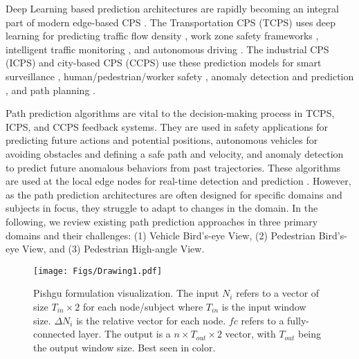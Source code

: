 \documentclass[sigconf]{acmart}
\begin{document}
Deep Learning based prediction architectures are rapidly becoming an integral part of modern edge-based CPS \cite{Zhou2021wide_atten, Isern2020Reconfig, deniz2022efficient}. The Transportation CPS (TCPS) uses deep learning for predicting traffic flow density \cite{Jeong2013traffFlow, chen2017research}, work zone safety frameworks \cite{sabeti2021toward, fang2018detecting, cai2020context}, intelligent traffic monitoring \cite{Chen2020WITM}, and autonomous driving \cite{cui2019multimodal, hussain2022vision}. The industrial CPS (ICPS) and city-based CPS (CCPS)  use these prediction models for smart surveillance \cite{Isern2020Reconfig, wu2019deep, pazho2023ancilia}, human/pedestrian/worker safety \cite{deniz2022efficient, wang2022intelligent}, anomaly detection and prediction \cite{jones2014anomaly, pustokhina2021automated}, and path planning \cite{farooq2021flow}. 

Path prediction algorithms are vital to the decision-making process in TCPS, ICPS, and CCPS feedback systems. They are used in safety applications for predicting future actions and potential positions, autonomous vehicles for avoiding obstacles and defining a safe path and velocity, and anomaly detection to predict future anomalous behaviors from past trajectories. These algorithms are used at the local edge nodes for real-time detection and prediction \cite{Isern2020Reconfig, sanchez2021real, jeon2020scale}. However, as the path prediction architectures are often designed for specific domains and subjects in focus, they struggle to adapt to changes in the domain. In the following, we review existing path prediction approaches in three primary domains and their {challenges}: (1) Vehicle Bird's-eye View, (2) Pedestrian Bird's-eye View, and (3) Pedestrian High-angle View.

\begin{figure*}[!b]
        \centering
               \texttt{[image: Figs/Drawing1.pdf]}
                
                \caption{Pishgu formulation visualization. The input $N_i$ refers to a vector of size $T_{in}\times2$ for each node/subject where $T_{in}$ is the input window size. $\Delta N_i$ is the relative vector for each node. $fc$ refers to a fully-connected layer. The output is a $n\times T_{out}\times 2$ vector, with $T_{out}$ being the output window size. Best seen in color.}
                                
                \label{fig:pishgu}
                \vspace{-10pt}
\end{figure*}
\end{document}
